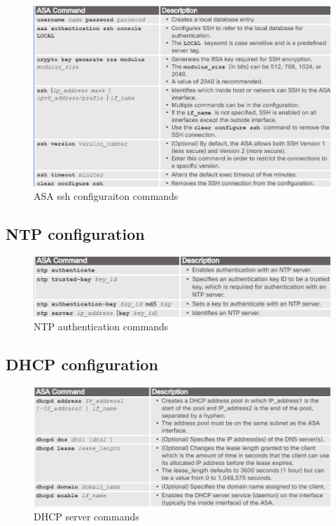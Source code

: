 \begin{figure}[hbtp]
\caption{ASA ssh configuraiton commands}\label{SSHconfigASA}
\centering
\includegraphics[scale=0.5]{pictures/SSHconfigASA.PNG}
\end{figure}

\subsection{NTP configuration}

\begin{figure}[hbtp]
\caption{NTP authentication commands}
\centering
\includegraphics[scale=1]{pictures/NTPauthentication.PNG}
\end{figure}

\subsection{DHCP configuration}

\begin{figure}[hbtp]
\caption{DHCP server commands}\label{DHCPcommandList}
\centering
\includegraphics[scale=0.5]{pictures/DHCPcommandList.PNG}
\end{figure}


